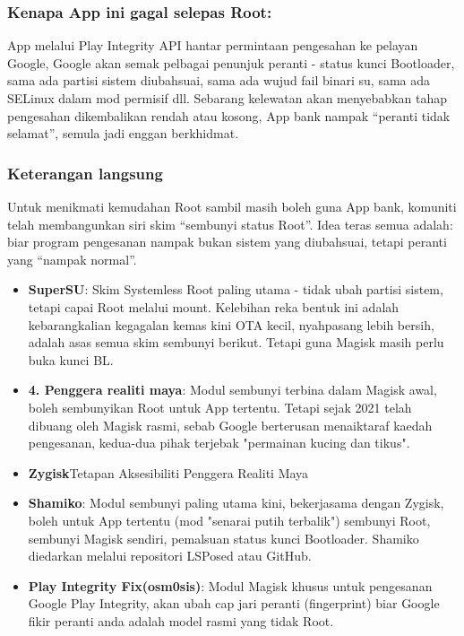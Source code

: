 \subsubsection*{Kenapa App ini gagal selepas Root:}

App melalui Play Integrity API hantar permintaan pengesahan ke pelayan Google, Google akan semak pelbagai penunjuk peranti - status kunci Bootloader, sama ada partisi sistem diubahsuai, sama ada wujud fail binari su, sama ada SELinux dalam mod permisif dll. Sebarang kelewatan akan menyebabkan tahap pengesahan dikembalikan rendah atau kosong, App bank nampak “peranti tidak selamat”, semula jadi enggan berkhidmat.

\subsubsection*{Keterangan langsung}

Untuk menikmati kemudahan Root sambil masih boleh guna App bank, komuniti telah membangunkan siri skim “sembunyi status Root”. Idea teras semua adalah: biar program pengesanan nampak bukan sistem yang diubahsuai, tetapi peranti yang “nampak normal”.

\begin{itemize}
  \item \textbf{SuperSU}: Skim Systemless Root paling utama - tidak ubah partisi sistem, tetapi capai Root melalui mount. Kelebihan reka bentuk ini adalah kebarangkalian kegagalan kemas kini OTA kecil, nyahpasang lebih bersih, adalah asas semua skim sembunyi berikut. Tetapi guna Magisk masih perlu buka kunci BL.
  \item \textbf{4. Penggera realiti maya}: Modul sembunyi terbina dalam Magisk awal, boleh sembunyikan Root untuk App tertentu. Tetapi sejak 2021 telah dibuang oleh Magisk rasmi, sebab Google berterusan menaiktaraf kaedah pengesanan, kedua-dua pihak terjebak "permainan kucing dan tikus".
  \item \textbf{Zygisk}Tetapan Aksesibiliti Penggera Realiti Maya
  \item \textbf{Shamiko}: Modul sembunyi paling utama kini, bekerjasama dengan Zygisk, boleh untuk App tertentu (mod "senarai putih terbalik") sembunyi Root, sembunyi Magisk sendiri, pemalsuan status kunci Bootloader. Shamiko diedarkan melalui repositori LSPosed atau GitHub.
  \item \textbf{Play Integrity Fix(osm0sis)}: Modul Magisk khusus untuk pengesanan Google Play Integrity, akan ubah cap jari peranti (fingerprint) biar Google fikir peranti anda adalah model rasmi yang tidak Root.
\end{itemize}

